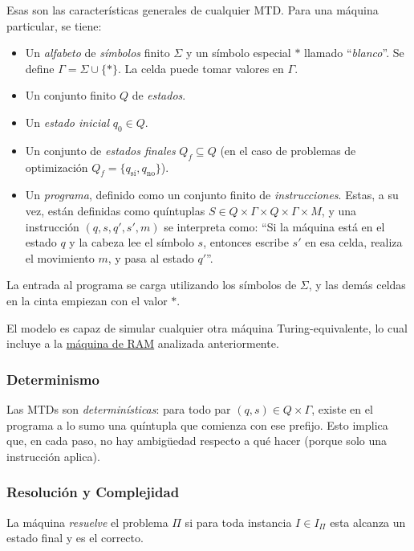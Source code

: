 Esas son las características generales de cualquier MTD. Para una máquina particular, se tiene:
\begin{itemize}
    \item Un \textit{alfabeto} de \textit{símbolos} finito $\Sigma$ y un símbolo especial $\ast$ llamado ``\textit{blanco}''. Se define $\Gamma = \Sigma \cup \{\ast\}$. La celda puede tomar valores en $\Gamma$.
    \item Un conjunto finito $Q$ de \textit{estados}.
    \item Un \textit{estado inicial} $q_0 \in Q$.
    \item Un conjunto de \textit{estados finales} $Q_f \subseteq Q$ (en el caso de problemas de optimización $Q_f = \{q_{\text{sí}}, q_{\text{no}}\}$).
    \item Un \textit{programa}, definido como un conjunto finito de \textit{instrucciones}. Estas, a su vez, están definidas como quíntuplas $S \in Q \times \Gamma \times Q \times \Gamma \times M$, y una instrucción $(q, s, q', s', m)$ se interpreta como: ``Si la máquina está en el estado $q$ y la cabeza lee el símbolo $s$, entonces escribe $s'$ en esa celda, realiza el movimiento $m$, y pasa al estado $q'$''.
\end{itemize}

La entrada al programa se carga utilizando los símbolos de $\Sigma$, y las demás celdas en la cinta empiezan con el valor $\ast$.

El modelo es capaz de simular cualquier otra máquina Turing-equivalente, lo cual incluye a la \hyperref[maquina-ram]{máquina de RAM} analizada anteriormente.

\subsubsection{Determinismo}

Las MTDs son \textit{determinísticas}: para todo par $(q, s) \in Q \times \Gamma$, existe en el programa a lo sumo una quíntupla que comienza con ese prefijo. Esto implica que, en cada paso, no hay ambigüedad respecto a qué hacer (porque solo una instrucción aplica).

\subsubsection{Resolución y Complejidad}

La máquina \textit{resuelve} el problema $\Pi$ si para toda instancia $I \in I_{\Pi}$ esta alcanza un estado final y es el correcto.

